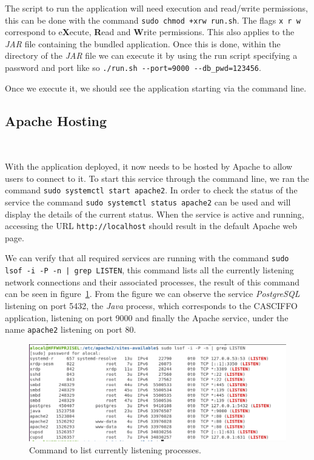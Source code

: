 The script to run the application will need execution and read/write permissions, this can be done with the command \lstinline{sudo chmod +xrw run.sh}. The flags \lstinline{x r w} correspond to e\textbf{X}ecute, \textbf{R}ead and \textbf{W}rite permissions. This also applies to the \textit{JAR} file containing the bundled application.
Once this is done, within the directory of the \textit{JAR} file we can execute it by using the run script specifying a password and port like so \lstinline{./run.sh --port=9000 --db_pwd=123456}.

Once we execute it, we should see the application starting via the command line.

\subsection{Apache Hosting}~\label{ch:impl:sec:install-deploy:ss:on-premises:ss:apache}

With the application deployed, it now needs to be hosted by Apache to allow users to connect to it.
To start this service through the command line, we ran the command \lstinline{sudo systemctl start apache2}.
In order to check the status of the service the command \lstinline{sudo systemctl status apache2} can be used and will display the details of the current status.
When the service is active and running, accessing the URL \lstinline{http://localhost} should result in the default Apache web page.

We can verify that all required services are running with the command \lstinline{sudo lsof -i -P -n | grep LISTEN}, this command lists all the currently listening network connections and their associated processes, the result of this command can be seen in figure~\ref{fig:list-programs}. From the figure we can observe the service \textit{PostgreSQL} listening on port 5432, the \textit{Java} process, which corresponds to the CASCIFFO application, listening on port 9000 and finally the Apache service, under the name \lstinline{apache2} listening on port 80.

\begin{figure}[H]
    \centering
    \includegraphics[scale=0.5]{Chapters/img/misc/ubuntu-services.png}
    \caption{Command to list currently listening processes.}
    \label{fig:list-programs}
\end{figure}




